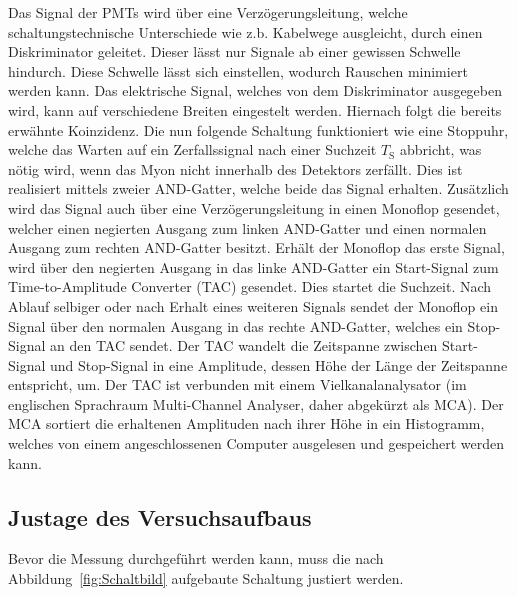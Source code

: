 Das Signal der PMTs wird über eine Verzögerungsleitung, welche schaltungstechnische Unterschiede
wie z.b. Kabelwege ausgleicht, durch einen Diskriminator geleitet. Dieser lässt nur Signale ab
einer gewissen Schwelle hindurch. Diese Schwelle lässt sich einstellen, wodurch Rauschen
minimiert werden kann. Das elektrische Signal, welches von dem Diskriminator ausgegeben wird,
kann auf verschiedene Breiten eingestelt werden. Hiernach folgt die bereits erwähnte Koinzidenz.
Die nun folgende Schaltung funktioniert wie eine Stoppuhr, welche das Warten auf ein Zerfallssignal
nach einer Suchzeit $T_{\text{S}}$ abbricht, was nötig wird, wenn das Myon nicht innerhalb des Detektors
zerfällt. Dies ist realisiert mittels zweier AND-Gatter, welche beide das Signal erhalten. Zusätzlich
wird das Signal auch über eine Verzögerungsleitung in einen Monoflop gesendet, welcher einen negierten
Ausgang zum linken AND-Gatter und einen normalen Ausgang zum rechten AND-Gatter besitzt. Erhält der
Monoflop das erste Signal, wird über den negierten Ausgang in das linke AND-Gatter ein Start-Signal zum
Time-to-Amplitude Converter (TAC) gesendet. Dies startet die Suchzeit. Nach Ablauf selbiger oder
nach Erhalt eines weiteren Signals sendet der Monoflop ein Signal über den normalen Ausgang in
das rechte AND-Gatter, welches ein Stop-Signal an den TAC sendet.
Der TAC wandelt die Zeitspanne zwischen Start-Signal und Stop-Signal in eine Amplitude, dessen Höhe der
Länge der Zeitspanne entspricht, um.
Der TAC ist verbunden mit einem Vielkanalanalysator (im englischen Sprachraum Multi-Channel Analyser, daher abgekürzt als MCA).
Der MCA sortiert die erhaltenen Amplituden nach ihrer Höhe in ein Histogramm, welches von einem
angeschlossenen Computer ausgelesen und gespeichert werden kann.

\subsection{Justage des Versuchsaufbaus}
\label{JustageVersuchsaufbau}

Bevor die Messung durchgeführt werden kann, muss die nach Abbildung~\ref{fig:Schaltbild} aufgebaute Schaltung justiert
werden.
